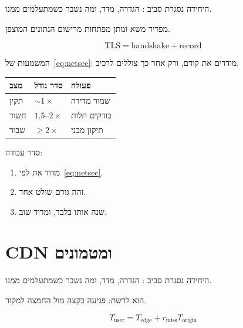 היחידה נסגרת סביב : הגדרה, מדד, ומה נשבר כשמתעלמים ממנו.

\begin{defbox}[frametitle={הגדרה — אבטחת רשת}]
 מפריד משא ומתן מפתחות מרישום הנתונים המוצפן.
\end{defbox}

\begin{equation}
\label{eq:netsec}
\mathrm{TLS}=\mathrm{handshake}+\mathrm{record}
\end{equation}

המשמעות של~\eqref{eq:netsec}: מודדים את  קודם, ורק אחר כך צוללים לרכיב.

\begin{tablebox}\centering\small
\begin{tabular}{@{}lll@{}}
\toprule
\textbf{מצב} & \textbf{סדר גודל} & \textbf{פעולה}\\
\midrule
תקין & $\sim 1\times$ & שמור מדידה\\
חשוד & $1.5$–$2\times$ & בודקים תלות\\
שבור & $\ge 2\times$ & תיקון מבני\\
\bottomrule
\end{tabular}
\end{tablebox}

סדר עבודה:
\begin{enumerate}
\item[(\textbf{א})] מדוד את  לפי~\eqref{eq:netsec}.
\item[(\textbf{ב})] זהה גורם שולט אחד.
\item[(\textbf{ג})] שנה אותו בלבד, ומדוד שוב.
\end{enumerate}

\chapter{CDN ומטמונים}
\label{ch:cdn}

היחידה נסגרת סביב : הגדרה, מדד, ומה נשבר כשמתעלמים ממנו.

\begin{keybox}[frametitle={רעיון מפתח — CDN ומטמונים}]
 הוא  לרשת: פגיעה בקצה מול החמצה למקור.
\end{keybox}

\begin{equation}
\label{eq:cdn}
T_{\mathrm{user}}=T_{\mathrm{edge}}+r_{\mathrm{miss}}T_{\mathrm{origin}}
\end{equation}

